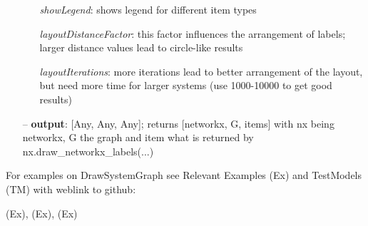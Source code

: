 \begin{itemize}[leftmargin=0.7cm]
\begin{itemize}[leftmargin=1.2cm]
\item[]{\it showLegend}: shows legend for different item types
\item[]{\it layoutDistanceFactor}: this factor influences the arrangement of labels; larger distance values lead to circle-like results
\item[]{\it layoutIterations}: more iterations lead to better arrangement of the layout, but need more time for larger systems (use 1000-10000 to get good results)
\end{itemize}
\item[--]
{\bf output}: [Any, Any, Any]; returns [networkx, G, items] with nx being networkx, G the graph and item what is returned by nx.draw\_networkx\_labels(...)
\vspace{12pt}\end{itemize}
%

%
\noindent For examples on DrawSystemGraph see Relevant Examples (Ex) and TestModels (TM) with weblink to github:
\bi
 \item \footnotesize {} (Ex), 
 (Ex), 
 (Ex)
\ei

%
